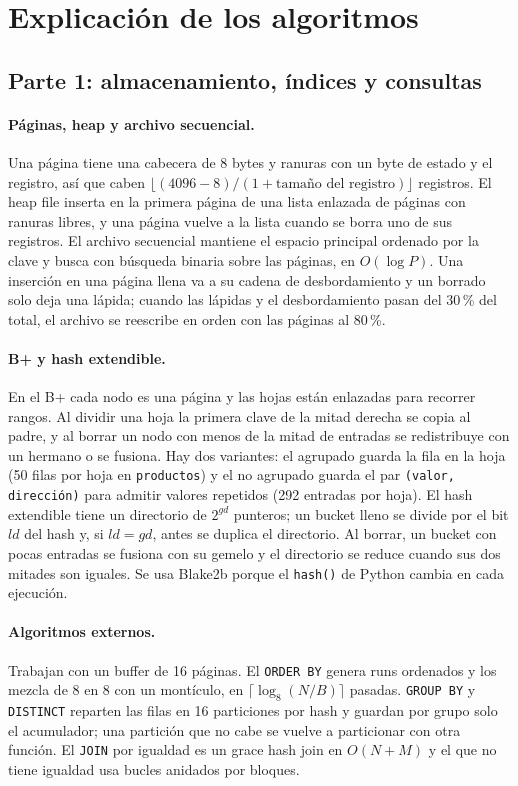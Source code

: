 \section{Explicación de los algoritmos}

\subsection{Parte 1: almacenamiento, índices y consultas}

\paragraph{Páginas, heap y archivo secuencial.} Una página tiene una cabecera de 8 bytes y
ranuras con un byte de estado y el registro, así que caben
$\lfloor (4096 - 8)/(1 + \text{tamaño del registro}) \rfloor$ registros. El heap file
inserta en la primera página de una lista enlazada de páginas con ranuras libres, y una
página vuelve a la lista cuando se borra uno de sus registros. El archivo secuencial
mantiene el espacio principal ordenado por la clave y busca con búsqueda binaria sobre las
páginas, en $O(\log P)$. Una inserción en una página llena va a su cadena de
desbordamiento y un borrado solo deja una lápida; cuando las lápidas y el desbordamiento
pasan del 30\,\% del total, el archivo se reescribe en orden con las páginas al 80\,\%.

\paragraph{B+ y hash extendible.} En el B+ cada nodo es una página y las hojas están
enlazadas para recorrer rangos. Al dividir una hoja la primera clave de la mitad derecha
se copia al padre, y al borrar un nodo con menos de la mitad de entradas se redistribuye
con un hermano o se fusiona. Hay dos variantes: el agrupado guarda la fila en la hoja (50
filas por hoja en \texttt{productos}) y el no agrupado guarda el par
\texttt{(valor, dirección)} para admitir valores repetidos (292 entradas por hoja). El hash
extendible tiene un directorio de $2^{gd}$ punteros; un bucket lleno se divide por el bit
$ld$ del hash y, si $ld = gd$, antes se duplica el directorio. Al borrar, un bucket con pocas
entradas se fusiona con su gemelo y el directorio se reduce cuando sus dos mitades son
iguales. Se usa Blake2b porque el \texttt{hash()} de Python cambia en cada ejecución.

\paragraph{Algoritmos externos.} Trabajan con un buffer de 16 páginas. El
\texttt{ORDER BY} genera runs ordenados y los mezcla de 8 en 8 con un montículo, en
$\lceil \log_8 (N/B) \rceil$ pasadas. \texttt{GROUP BY} y \texttt{DISTINCT} reparten las
filas en 16 particiones por hash y guardan por grupo solo el acumulador; una partición que
no cabe se vuelve a particionar con otra función. El \texttt{JOIN} por igualdad es un
grace hash join en $O(N+M)$ y el que no tiene igualdad usa bucles anidados por bloques.

